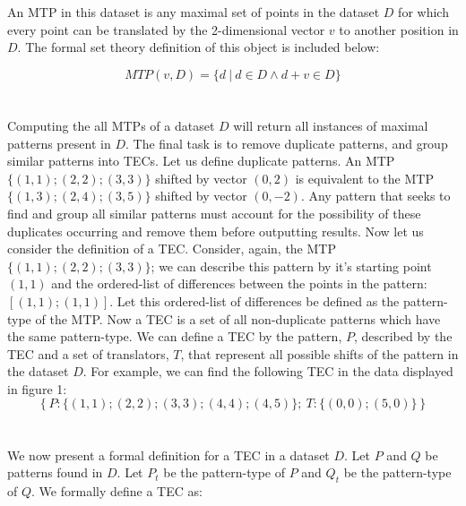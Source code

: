 \documentclass[12pt]{article}
\begin{document}
An MTP in this dataset is any maximal set of points in the dataset $D$ for which every point can be translated by the 2-dimensional vector $v$ to another position in $D$. The formal set theory definition of this object is included below:

$$MTP(v, D)  = \{ d ~|~ d \in D \land d + v \in D \}$$
\\
\\Computing the all MTPs of a dataset $D$ will return all instances of maximal patterns present in $D$. The final task is to remove duplicate patterns, and group similar patterns into TECs. Let us define duplicate patterns. An MTP $\{(1, 1); (2, 2); (3, 3)\}$ shifted by vector $(0, 2)$ is equivalent to the MTP $\{(1, 3); (2, 4); (3, 5)\}$ shifted by vector $(0, -2)$. Any pattern that seeks to find and group all similar patterns must account for the possibility of these duplicates occurring and remove them before outputting results. Now let us consider the definition of a TEC. Consider, again, the MTP $\{(1, 1); (2, 2); (3, 3)\}$; we can describe this pattern by it's starting point $(1, 1)$ and the ordered-list of differences between the points in the pattern: $[(1, 1); (1, 1)]$. Let this ordered-list of differences be defined as the pattern-type of the MTP. Now a TEC is a set of all non-duplicate patterns which have the same pattern-type. We can define a TEC by the pattern, $P$, described by the TEC and a set of translators, $T$, that represent all possible shifts of the pattern in the dataset $D$. For example, we can find the following TEC in the data displayed in figure 1: 
$$\left\{ P:\{(1, 1); (2, 2); (3, 3); (4, 4); (4, 5)\}; ~ T: \{(0, 0); (5, 0)\} \right\}$$
\\
\\ We now present a formal definition for a TEC in a dataset $D$. Let $P$ and $Q$ be patterns found in $D$. Let $P_t$ be the pattern-type of $P$ and $Q_t$ be the pattern-type of $Q$. We formally define a TEC as:
\end{document}
